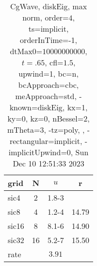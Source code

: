 \begin{table}[H]\tableFont %
\begin{center}
\begin{tabular}{|l|c|c|c|} \hline 
grid  & N &  $ u $ & r \\ \hline 
      sic4 &     2 & \num{1.8}{-3} &        \\ \hline
      sic8 &     4 & \num{1.2}{-4} & 14.79  \\ \hline
     sic16 &     8 & \num{8.1}{-6} & 14.90  \\ \hline
     sic32 &    16 & \num{5.2}{-7} & 15.50  \\ \hline
    rate             &       &  $3.91$       &       \\ \hline
\end{tabular}
\caption{CgWave, diskEig, max norm, order=$4$, ts=implicit, orderInTime=-1, dtMax0=$10000000000$, $t=.65$, cfl=$1.5$, upwind=1, bc=n, bcApproach=cbc, meApproach=std, -known=diskEig, kx=1, ky=0, kz=0, nBessel=2, mTheta=3, -tz=poly, , -rectangular=implicit, -implicitUpwind=0, Sun Dec 10 12:51:33 2023}\label{table:diskEigOrder4max}
\end{center}
\end{table}
